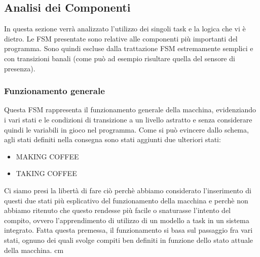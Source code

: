 \documentclass{article}
\begin{document}
\subsection{Analisi dei Componenti}
In questa sezione verrà analizzato l'utilizzo dei singoli task e la logica che vi è dietro. Le FSM presentate sono relative alle componenti più importanti del programma. Sono quindi escluse dalla trattazione FSM estremamente semplici e con transizioni banali (come può ad esempio risultare quella del sensore di presenza).

\subsubsection{Funzionamento generale}
Questa FSM rappresenta il funzionamento generale della macchina, evidenziando i vari stati e le condizioni di transizione a un livello astratto e senza considerare quindi le variabili in gioco nel programma. Come si può evincere dallo schema, agli stati definiti nella consegna sono stati aggiunti due ulteriori stati:
\begin{itemize}
	\item MAKING COFFEE
	\item TAKING COFFEE
\end{itemize}
Ci siamo presi la libertà di fare ciò perchè abbiamo considerato l'inserimento di questi due stati più esplicativo del funzionamento della macchina e perchè non abbiamo ritenuto che questo rendesse più facile o snaturasse l'intento del compito, ovvero l'apprendimento di utilizzo di un modello a task in un sistema integrato. \newline
Fatta questa premessa, il funzionamento si basa sul passaggio fra vari stati, ognuno dei quali svolge compiti ben definiti in funzione dello stato attuale della macchina.
 cm
\end{document}
